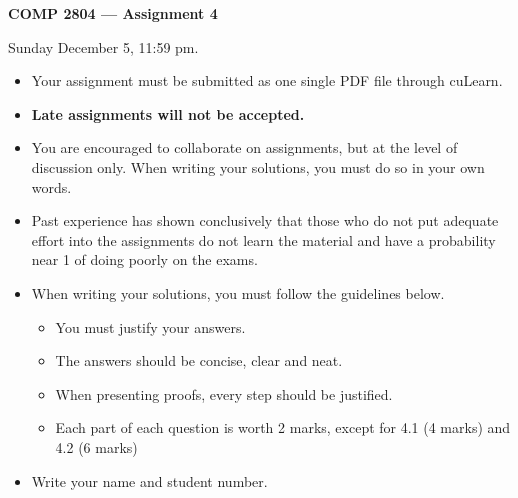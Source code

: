 \documentclass[12pt]{article}
\newcounter{ques}
\newenvironment{question}{\stepcounter{ques}{\noindent\bf Question \arabic{ques}:}}{\vspace{5mm}}
\begin{document}
\begin{center} \Large\bf
COMP 2804 --- Assignment 4
\end{center}

 Sunday December 5, 11:59 pm.

\vspace{0.5em}

\begin{itemize}
\item Your assignment must be submitted as one single PDF file through
      cuLearn.
\item {\bf Late assignments will not be accepted.}
\item You are encouraged to collaborate on assignments, but at the level
      of discussion only. When writing your solutions, you must do so
      in your own words.
\item Past experience has shown conclusively that those who do not put
      adequate effort into the assignments do not learn the material and
      have a probability near 1 of doing poorly on the exams.
\item When writing your solutions, you must follow the guidelines below.
      \begin{itemize}
      \item You must justify your answers.
      \item The answers should be concise, clear and neat.
      \item When presenting proofs, every step should be justified.
      \item Each part of each question is worth 2 marks, except for 4.1 (4 marks) and 4.2 (6 marks)
      \end{itemize}
\end{itemize}

\begin{question}
\begin{itemize}
\item Write your name and student number.
\end{itemize}
\end{question}
\end{document}
